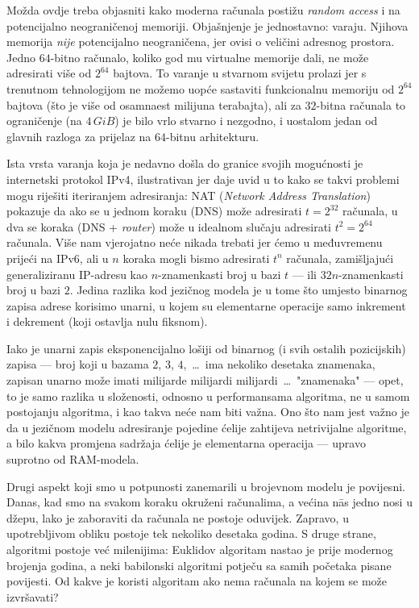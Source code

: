 Možda ovdje treba objasniti kako moderna računala postižu \emph{random access} i na potencijalno neograničenoj memoriji. Objašnjenje je jednostavno: varaju. Njihova memorija \emph{nije} potencijalno neograničena, jer ovisi o veličini adresnog prostora. Jedno $64$-bitno računalo, koliko god mu virtualne memorije dali, ne može adresirati više od $2^{64}$ bajtova. To varanje u stvarnom svijetu prolazi jer s trenutnom tehnologijom ne možemo uopće sastaviti funkcionalnu memoriju od $2^{64}$ bajtova (što je više od osamnaest milijuna terabajta), ali za $32$-bitna računala to ograničenje (na $4\,GiB$) je bilo vrlo stvarno i nezgodno, i uostalom jedan od glavnih razloga za prijelaz na $64$-bitnu arhitekturu.

Ista vrsta varanja koja je nedavno došla do granice svojih mogućnosti je internetski protokol IPv4, ilustrativan jer daje uvid u to kako se takvi problemi mogu riješiti iteriranjem adresiranja: NAT (\emph{Network Address Translation}) pokazuje da ako se u jednom koraku (DNS) može adresirati $t=2^{32}$ računala, u dva se koraka (DNS + \emph{router}) može u idealnom slučaju adresirati $t^2=2^{64}$ računala. Više nam vjerojatno neće nikada trebati jer ćemo u međuvremenu prijeći na IPv6, ali u $n$ koraka mogli bismo adresirati $t^n$ računala, zamišljajući generaliziranu IP-adresu kao $n$-znamenkasti broj u bazi $t$ --- ili $32n$-znamenkasti broj u bazi $2$. Jedina razlika kod jezičnog modela je u tome što umjesto binarnog zapisa adrese korisimo unarni, u kojem su elementarne operacije samo inkrement i dekrement (koji ostavlja nulu fiksnom).

Iako je unarni zapis eksponencijalno lošiji od binarnog (i svih ostalih pozicijskih) zapisa --- broj koji u bazama $2$, $3$, $4$,~\ldots\ ima nekoliko desetaka znamenaka, zapisan unarno može imati milijarde milijardi milijardi~\ldots\ "znamenaka" --- opet, to je samo razlika u složenosti, odnosno u performansama algoritma, ne u samom postojanju algoritma, i kao takva neće nam biti važna. Ono što nam jest važno je da u jezičnom modelu adresiranje pojedine ćelije zahtijeva netrivijalne algoritme, a bilo kakva promjena sadržaja ćelije je elementarna operacija --- upravo suprotno od RAM-modela.


Drugi aspekt koji smo u potpunosti zanemarili u brojevnom modelu je povijesni. Danas, kad smo na svakom koraku okruženi računalima, a većina n\=as jedno nosi u džepu, lako je zaboraviti da računala ne postoje oduvijek. Zapravo, u upotrebljivom obliku postoje tek nekoliko desetaka godina. S druge strane, algoritmi postoje već milenijima: Euklidov algoritam nastao je prije modernog brojenja godina, a neki babilonski algoritmi potječu sa samih početaka pisane povijesti. Od kakve je koristi algoritam ako nema računala na kojem se može izvršavati?

